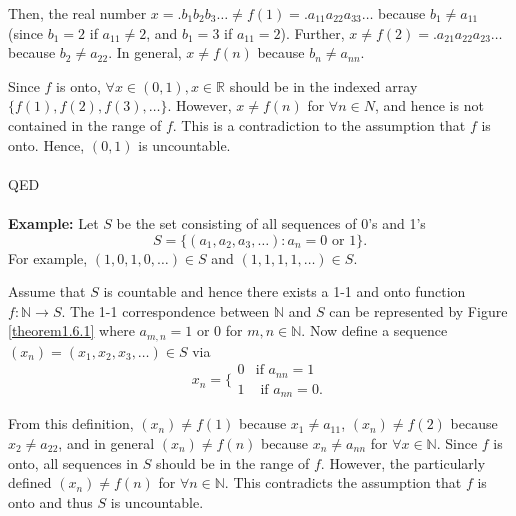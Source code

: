 \documentclass{article}
\begin{document}
            Then, the real number $x=.b_1b_2b_3\dots \neq f(1)=.a_{11}a_{22}a_{33}\dots$ because $b_1 \neq a_{11}$ (since $b_1 = 2$ if $a_{11} \neq 2$, and $b_1 = 3$ if $a_{11} = 2$). Further, $x \neq f(2)=.a_{21}a_{22}a_{23}\dots$ because $b_2 \neq a_{22}$. In general, $x \neq f(n)$ because $b_n \neq a_{nn}$.
            
            Since $f$ is onto, $\forall x\in (0,1),x\in \mathbb{R}$ should be in the indexed array $\{f(1), f(2), f(3), \dots\}$. However, $x \neq f(n)$ for $\forall n \in N$, and hence is not contained in the range of $f$. This is a contradiction to the assumption that $f$ is onto. Hence, $(0,1)$ is uncountable.\\ \\
            QED \\ \\
            \textbf{Example:} Let $S$ be the set consisting of all sequences of 0's and 1's
            \begin{equation*}
                S = \{(a_1,a_2,a_3,\dots):a_n = 0 \text{ or } 1\}.
            \end{equation*}
            For example, $(1,0,1,0,\dots) \in S$ and $(1,1,1,1,\dots) \in S$.
            
            Assume that $S$ is countable and hence there exists a 1-1 and onto function $f: \mathbb{N} \to S$. The 1-1 correspondence between $\mathbb{N}$ and $S$ can be represented by Figure \ref{theorem1.6.1} where $a_{m,n} = 1 \text{ or } 0$ for $m,n \in \mathbb{N}$. Now define a sequence $(x_n) = (x_1,x_2,x_3,\dots) \in S$ via
            \begin{equation*}
                x_n = \bigg\{ \begin{matrix}0 & \text{if } a_{nn} = 1 \\ 1 & \text{ if } a_{nn} = 0.\end{matrix}
            \end{equation*}
            
            From this definition, $(x_n) \neq f(1)$ because $x_1 \neq a_{11}$, $(x_n) \neq f(2)$ because $x_2 \neq a_{22}$, and in general $(x_n) \neq f(n)$ because $x_n \neq a_{nn}$ for $\forall x \in \mathbb{N}$. Since $f$ is onto, all sequences in $S$ should be in the range of $f$. However, the particularly defined $(x_n) \neq f(n)$ for $\forall n \in \mathbb{N}$. This contradicts the assumption that $f$ is onto and thus $S$ is uncountable. 
        
\end{document}
